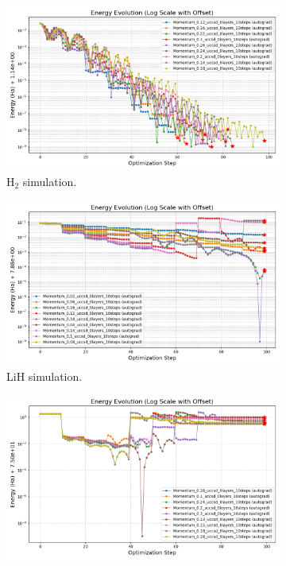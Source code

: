 \begin{figure}[H]
  \centering
  \begin{subfigure}{0.32\textwidth}
    \includegraphics[width=\textwidth]{data/StepSize/results_H2/energy_evolution_log_offset.png}
    \caption{H$_2$ simulation.}
    \label{fig:step_size_h2}
  \end{subfigure}
  \begin{subfigure}{0.32\textwidth}
    \includegraphics[width=\textwidth]{data/StepSize/results_LiH/energy_evolution_log_offset.png}
    \caption{LiH simulation.}
    \label{fig:step_size_lih}
  \end{subfigure}
  \begin{subfigure}{0.32\textwidth}
    \includegraphics[width=\textwidth]{data/StepSize/results_H2O/energy_evolution_log_offset.png}

\end{subfigure}
\end{figure}
